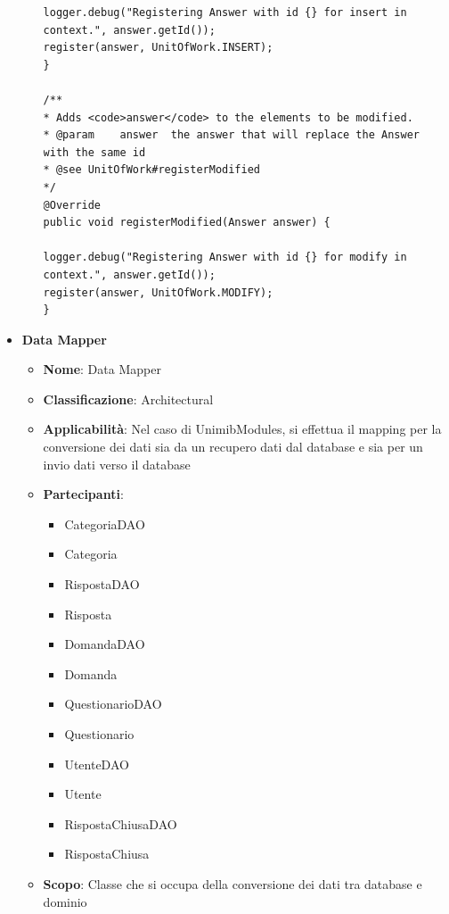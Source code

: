 \documentclass[12pt]{article}
\begin{document}
\begin{itemize}
\begin{itemize}
\begin{lstlisting}
logger.debug("Registering Answer with id {} for insert in context.", answer.getId());
register(answer, UnitOfWork.INSERT);
}

/**
* Adds <code>answer</code> to the elements to be modified.
* @param	answer	the answer that will replace the Answer with the same id
* @see UnitOfWork#registerModified
*/
@Override
public void registerModified(Answer answer) {

logger.debug("Registering Answer with id {} for modify in context.", answer.getId());
register(answer, UnitOfWork.MODIFY);
}
            \end{lstlisting}
        \end{itemize}
        
        
		\item \textbf{Data Mapper}
		\begin{itemize}
            \item \textbf{Nome}: Data Mapper
            \item \textbf{Classificazione}: Architectural
            \item \textbf{Applicabilità}: Nel caso di UnimibModules, si effettua il mapping per la conversione dei dati sia da un recupero dati dal database e sia per un invio dati verso il database
            \item \textbf{Partecipanti}:
                \begin{itemize}
                    \item CategoriaDAO
                    \item Categoria
                    \item RispostaDAO
                    \item Risposta
                    \item DomandaDAO
                    \item Domanda
                    \item QuestionarioDAO
                    \item Questionario
                    \item UtenteDAO
                    \item Utente
                    \item RispostaChiusaDAO
                    \item RispostaChiusa
                \end{itemize}
            \item \textbf{Scopo}: Classe che si occupa della conversione dei dati tra database e dominio
        \end{itemize}
		

\end{itemize}
\end{document}
